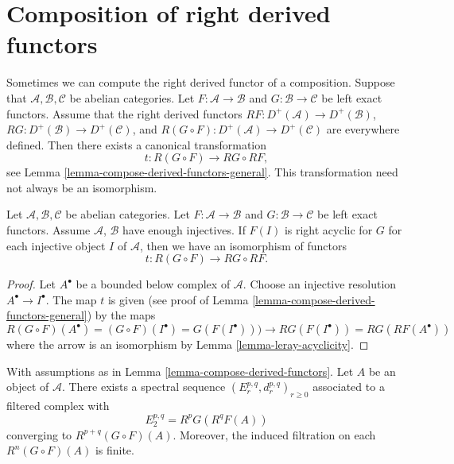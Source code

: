 \section{Composition of right derived functors}
\label{section-composition-right-derived-functors}

\noindent
Sometimes we can compute the right derived functor of a composition.
Suppose that $\mathcal{A}, \mathcal{B}, \mathcal{C}$ be abelian categories.
Let $F : \mathcal{A} \to \mathcal{B}$ and $G : \mathcal{B} \to \mathcal{C}$
be left exact functors. Assume that the right derived functors
$RF : D^{+}(\mathcal{A}) \to D^{+}(\mathcal{B})$,
$RG : D^{+}(\mathcal{B}) \to D^{+}(\mathcal{C})$, and
$R(G \circ F) : D^{+}(\mathcal{A}) \to D^{+}(\mathcal{C})$
are everywhere defined. Then there exists a canonical transformation
$$
t : R(G \circ F) \longrightarrow RG \circ RF,
$$
see
Lemma \ref{lemma-compose-derived-functors-general}.
This transformation need not always be an isomorphism.

\begin{lemma}
\label{lemma-compose-derived-functors}
Let $\mathcal{A}, \mathcal{B}, \mathcal{C}$ be abelian categories.
Let $F : \mathcal{A} \to \mathcal{B}$
and $G : \mathcal{B} \to \mathcal{C}$ be left exact functors.
Assume $\mathcal{A}$, $\mathcal{B}$ have enough injectives.
If $F(I)$ is right acyclic for $G$ for each injective object $I$
of $\mathcal{A}$, then we have an isomorphism of functors
$$
t : R(G \circ F) \longrightarrow RG \circ RF.
$$
\end{lemma}

\begin{proof}
Let $A^\bullet$ be a bounded below complex of $\mathcal{A}$.
Choose an injective resolution $A^\bullet \to I^\bullet$.
The map $t$ is given (see proof of
Lemma \ref{lemma-compose-derived-functors-general})
by the maps
$$
R(G \circ F)(A^\bullet) =
(G \circ F)(I^\bullet) =
G(F(I^\bullet))) \to
RG(F(I^\bullet)) =
RG(RF(A^\bullet))
$$
where the arrow is an isomorphism by
Lemma \ref{lemma-leray-acyclicity}.
\end{proof}

\begin{lemma}
\label{lemma-grothendieck-spectral-sequence}
With assumptions as in Lemma \ref{lemma-compose-derived-functors}.
Let $A$ be an object of $\mathcal{A}$.
There exists a spectral sequence $(E_r^{p, q}, d_r^{p, q})_{r \geq 0}$
associated to a filtered complex with
$$
E_2^{p, q} = R^pG(R^qF(A))
$$
converging to $R^{p + q}(G \circ F)(A)$. Moreover, the induced filtration
on each $R^n(G \circ F)(A)$ is finite.
\end{lemma}

